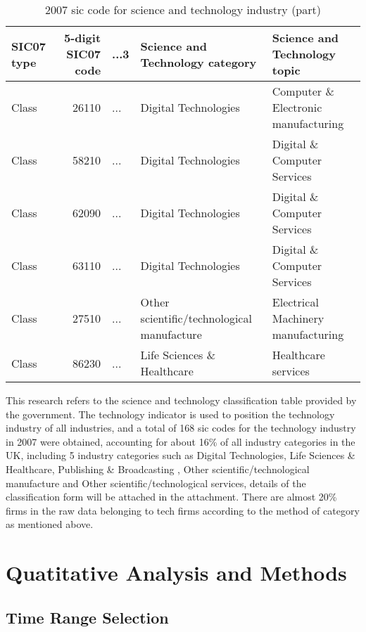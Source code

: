\documentclass[
  12pt,
  oneside]{book}
\begin{document}
\begin{table}

\caption{\label{tab:table-1}2007 sic code for science and technology industry (part)}
\centering
\begin{tabular}[t]{lrlll}
\toprule
SIC07 type & 5-digit SIC07 code & ...3 & Science and Technology category & Science and Technology topic\\
\midrule
Class & 26110 & ... & Digital Technologies & Computer \& Electronic manufacturing\\
Class & 58210 & ... & Digital Technologies & Digital \& Computer Services\\
Class & 62090 & ... & Digital Technologies & Digital \& Computer Services\\
Class & 63110 & ... & Digital Technologies & Digital \& Computer Services\\
Class & 27510 & ... & Other scientific/technological manufacture & Electrical Machinery manufacturing\\
\addlinespace
Class & 86230 & ... & Life Sciences \& Healthcare & Healthcare services\\
\bottomrule
\end{tabular}
\end{table}

This research refers to the science and technology classification table provided by the government. The technology indicator is used to position the technology industry of all industries, and a total of 168 sic codes for the technology industry in 2007 were obtained, accounting for about 16\% of all industry categories in the UK, including 5 industry categories such as Digital Technologies, Life Sciences \& Healthcare, Publishing \& Broadcasting , Other scientific/technological manufacture and Other scientific/technological services, details of the classification form will be attached in the attachment. There are almost 20\% firms in the raw data belonging to tech firms according to the method of category as mentioned above.

\hypertarget{quatitative-analysis-and-methods}{%
\section{Quatitative Analysis and Methods}\label{quatitative-analysis-and-methods}}

\hypertarget{time-range-selection}{%
\subsection{Time Range Selection}\label{time-range-selection}}
\end{document}
